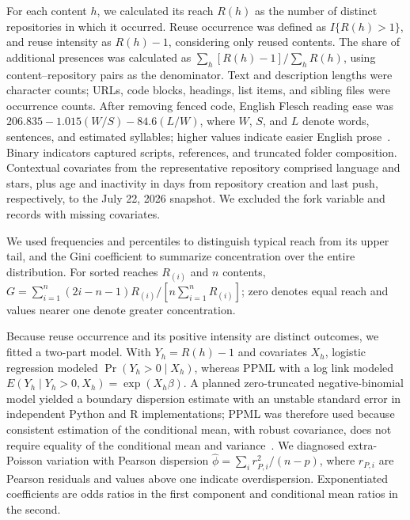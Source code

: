 \documentclass[conference]{IEEEtran}
\begin{document}
For each content $h$, we calculated its reach $R(h)$ as the number of distinct repositories in which it occurred. Reuse occurrence was defined as $I\{R(h)>1\}$, and reuse intensity as $R(h)-1$, considering only reused contents. The share of additional presences was calculated as $\sum_h[R(h)-1]/\sum_hR(h)$, using content--repository pairs as the denominator. Text and description lengths were character counts; URLs, code blocks, headings, list items, and sibling files were occurrence counts. After removing fenced code, English Flesch reading ease was $206.835-1.015(W/S)-84.6(L/W)$, where $W$, $S$, and $L$ denote words, sentences, and estimated syllables; higher values indicate easier English prose~\cite{flesch1948}. Binary indicators captured scripts, references, and truncated folder composition. Contextual covariates from the representative repository comprised language and stars, plus age and inactivity in days from repository creation and last push, respectively, to the July 22, 2026 snapshot. We excluded the fork variable and records with missing covariates.

We used frequencies and percentiles to distinguish typical reach from its upper tail, and the Gini coefficient to summarize concentration over the entire distribution. For sorted reaches $R_{(i)}$ and $n$ contents, $G=\sum_{i=1}^{n}(2i-n-1)R_{(i)}/[n\sum_{i=1}^{n}R_{(i)}]$; zero denotes equal reach and values nearer one denote greater concentration.

Because reuse occurrence and its positive intensity are distinct outcomes, we fitted a two-part model. With $Y_h=R(h)-1$ and covariates $X_h$, logistic regression modeled $\Pr(Y_h>0\mid X_h)$, whereas PPML with a log link modeled $E(Y_h\mid Y_h>0,X_h)=\exp(X_h\beta)$. A planned zero-truncated negative-binomial model yielded a boundary dispersion estimate with an unstable standard error in independent Python and R implementations; PPML was therefore used because consistent estimation of the conditional mean, with robust covariance, does not require equality of the conditional mean and variance~\cite{gourieroux1984}. We diagnosed extra-Poisson variation with Pearson dispersion $\hat\phi=\sum_i r_{P,i}^2/(n-p)$, where $r_{P,i}$ are Pearson residuals and values above one indicate overdispersion. Exponentiated coefficients are odds ratios in the first component and conditional mean ratios in the second.
\end{document}
